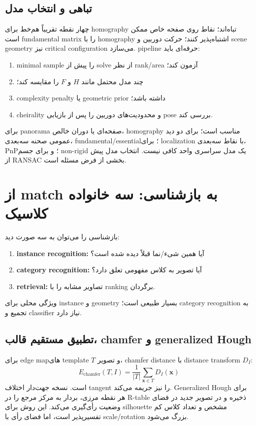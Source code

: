 \documentclass[12pt,openany,oneside]{book}
\newcommand{\vect}[1]{\bm{#1}}
\begin{document}
\subsection{تباهی و انتخاب مدل}
چهار نقطه تقریباً هم‌خط برای homography تباه‌اند؛ نقاط روی صفحه خاص ممکن است fundamental matrix را با homography اشتباه‌پذیر کنند؛ حرکت دوربین و scene geometry
نیز critical configuration می‌سازد. pipeline حرفه‌ای باید:
\begin{enumerate}
\item minimal sample را پیش از solve از نظر rank/area آزمون کند؛
\item چند مدل محتمل مانند $H$ و $F$ را مقایسه کند؛
\item complexity penalty یا geometric prior داشته باشد؛
\item cheirality و محدودیت‌های دوربین را پس از بازیابی pose بررسی کند.
\end{enumerate}

\begin{keybox}
برای panorama صفحه‌ای یا دوران خالص، homography مناسب است؛ برای دو دید عمومی صحنه سه‌بعدی، fundamental/essential؛ برای localization با نقاط سه‌بعدی، PnP؛
و برای جسم non-rigid یک مدل سراسری واحد کافی نیست. انتخاب مدل پیش از RANSAC بخشی از فرض مسئله است.
\end{keybox}

\section{از match به بازشناسی: سه خانواده کلاسیک}
بازشناسی را می‌توان به سه صورت دید:
\begin{enumerate}
\item \textbf{instance recognition:} آیا همین شیء/نما قبلاً دیده شده است؟
\item \textbf{category recognition:} آیا تصویر به کلاس مفهومی تعلق دارد؟
\item \textbf{retrieval:} تصاویر مشابه را با ranking برگردان.
\end{enumerate}
ویژگی محلی برای instance و geometry بسیار طبیعی است؛ category recognition به تجمیع و classifier نیاز دارد.

\subsection{تطبیق مستقیم قالب، chamfer و generalized Hough}
برای edge mapهای template $T$ و تصویر، chamfer distance با distance transform $D_I$:
\begin{equation}
E_{\mathrm{chamfer}}(T,I)=\frac1{|T|}\sum_{\vect x\in T}D_I(\vect x)
\end{equation}
است. نسخه جهت‌دار اختلاف tangent را نیز جریمه می‌کند. Generalized Hough برای هر نقطه مرزی، بردار به مرکز مرجع را در R-table ذخیره و در تصویر جدید در فضای
وضعیت رأی‌گیری می‌کند. این روش برای silhouette مشخص و تعداد کلاس کم تفسیرپذیر است، اما فضای رأی با scale/rotation بزرگ می‌شود.
\end{document}

